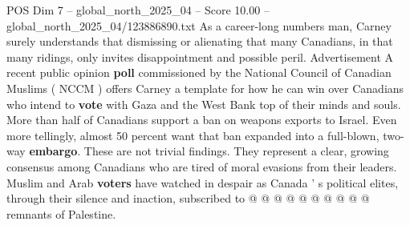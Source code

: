 \begin{textsample}{POS Dim 7 – global\_north\_2025\_04 – Score 10.00 – global\_north\_2025\_04/123886890.txt}
As a career-long numbers man, Carney surely understands that dismissing or alienating that many Canadians, in that many ridings, only invites disappointment and possible peril.
Advertisement A recent public opinion \textbf{poll} commissioned by the National Council of Canadian Muslims ( NCCM ) offers Carney a template for how he can win over Canadians who intend to \textbf{vote} with Gaza and the West Bank top of their minds and souls.
More than half of Canadians support a ban on weapons exports to Israel.
Even more tellingly, almost 50 percent want that ban expanded into a full-blown, two-way \textbf{embargo}.
These are not trivial findings.
They represent a clear, growing consensus among Canadians who are tired of moral evasions from their leaders.
Muslim and Arab \textbf{voters} have watched in despair as Canada ' s political elites, through their silence and inaction, subscribed to @ @ @ @ @ @ @ @ @ @ remnants of Palestine.

\end{textsample}
